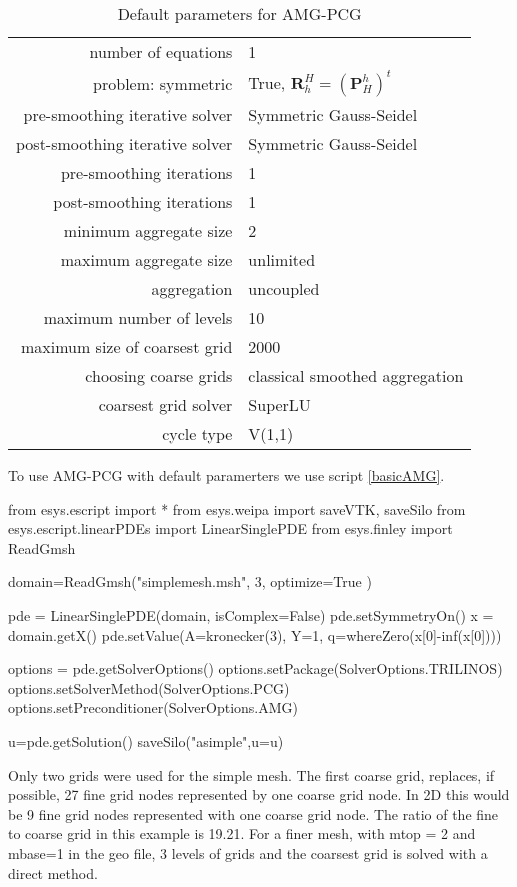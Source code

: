 \begin{table}\center
\begin{tabular}{|r|l|}
\hline
    number of equations & 1\\
    problem: symmetric & True, $\mathbf{R}_h^H = (\mathbf{P}^h_H)^t$ \\
    pre-smoothing iterative solver & Symmetric Gauss-Seidel\\
    post-smoothing iterative solver & Symmetric Gauss-Seidel\\
    pre-smoothing iterations & 1 \\
    post-smoothing iterations & 1 \\
    minimum aggregate size & 2 \\
    maximum aggregate size & unlimited \\
    aggregation & uncoupled \\
    maximum number of levels & 10\\
    maximum size of coarsest grid & 2000\\
    choosing coarse grids & classical smoothed aggregation\\
    coarsest grid solver &  SuperLU\\
    cycle type & V(1,1) \\
    \hline
\end{tabular}\caption{Default parameters for AMG-PCG}
\end{table}

To use AMG-PCG with default paramerters we use script \ref{basicAMG}. 
\begin{python}[caption=basic Trilinos PCG-AMG defaults only script, label=basicAMG ]
from esys.escript import *
from esys.weipa import saveVTK, saveSilo
from esys.escript.linearPDEs import LinearSinglePDE
from esys.finley import ReadGmsh

domain=ReadGmsh("simplemesh.msh", 3,  optimize=True )

pde = LinearSinglePDE(domain, isComplex=False)
pde.setSymmetryOn()
x = domain.getX()
pde.setValue(A=kronecker(3), Y=1, q=whereZero(x[0]-inf(x[0])))

options = pde.getSolverOptions()
options.setPackage(SolverOptions.TRILINOS)
options.setSolverMethod(SolverOptions.PCG)
options.setPreconditioner(SolverOptions.AMG)

u=pde.getSolution()    
saveSilo("asimple",u=u)    
\end{python}

Only two grids were used for the simple mesh.  The first coarse grid, replaces, if possible, 27 fine grid nodes represented by  one coarse grid node.  In 2D this would be 9 fine grid nodes represented with one coarse grid node. The ratio of the fine to coarse grid in this example is 19.21.  For a finer mesh, with mtop = 2 and mbase=1 in the geo file, 3 levels of grids and the coarsest grid is solved with a direct method.  

